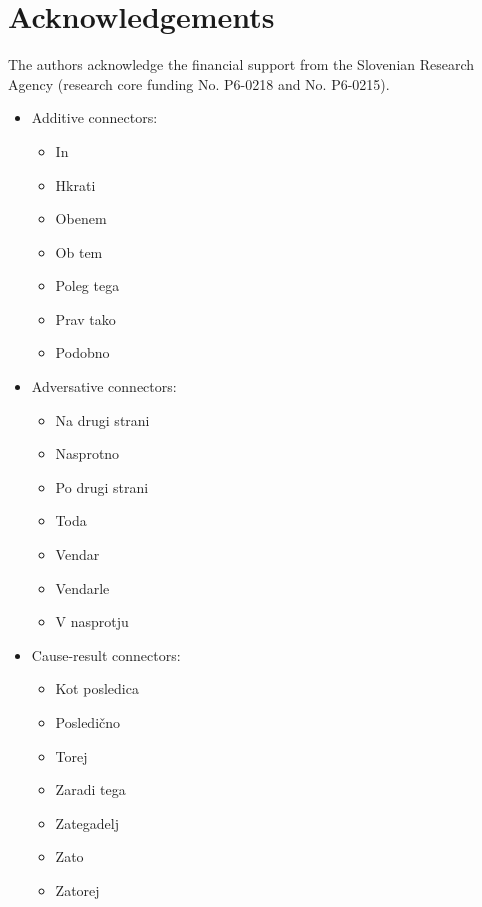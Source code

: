 \documentclass[output=paper]{langscibook}
\begin{document}
\section*{
Acknowledgements
}

The authors acknowledge the financial support from the Slovenian Research Agency (research core funding No. P6-0218 and No. P6-0215).



\label{ap:mikolic:1}

\begin{itemize}
\item Additive connectors:
  \begin{itemize}
    \item In
    \item Hkrati
    \item Obenem
    \item Ob tem
    \item Poleg tega
    \item Prav tako
    \item Podobno
  \end{itemize}

\item Adversative connectors:
  \begin{itemize}
    \item Na drugi strani
    \item Nasprotno
    \item Po drugi strani
    \item Toda
    \item Vendar
    \item Vendarle
    \item V nasprotju
  \end{itemize}
\item Cause-result connectors:
  \begin{itemize}
    \item Kot posledica
    \item Posledično
    \item Torej
    \item Zaradi tega
    \item Zategadelj
    \item Zato
    \item Zatorej
  \end{itemize}
\end{itemize}

\sloppy\printbibliography[heading=subbibliography,notkeyword=this]
\end{document}
